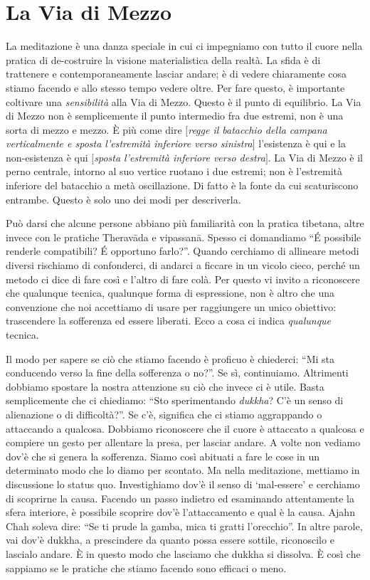 \section*{La Via di Mezzo}

La meditazione è una danza speciale in cui ci impegniamo con tutto il cuore nella pratica di de-costruire la visione materialistica della realtà. La sfida è di trattenere e contemporaneamente lasciar andare; è di vedere chiaramente cosa stiamo facendo e allo stesso tempo vedere oltre. Per fare questo, è importante coltivare una \textit{sensibilità} alla Via di Mezzo. Questo è il punto di equilibrio. La Via di Mezzo non è semplicemente il punto intermedio fra due estremi, non è una sorta di mezzo e mezzo. È più come dire $[$\textit{regge il batacchio della campana verticalmente e sposta l'estremità inferiore verso sinistra}$]$ l'esistenza è qui e la non-esistenza è qui $[$\textit{sposta l'estremità inferiore verso destra}$]$. La Via di Mezzo è il perno centrale, intorno al suo vertice ruotano i due estremi; non è l'estremità inferiore del batacchio a metà oscillazione. Di fatto è la fonte da cui scaturiscono entrambe. Questo è solo uno dei modi per descriverla.

Può darsi che alcune persone abbiano più familiarità con la pratica tibetana, altre invece con le pratiche Theravāda e vipassanā. Spesso ci domandiamo ``É possibile renderle compatibili? É opportuno farlo?''. Quando cerchiamo di allineare metodi diversi rischiamo di confonderci, di andarci a ficcare in un vicolo cieco, perché un metodo ci dice di fare così e l'altro di fare colà. Per questo vi invito a riconoscere che qualunque tecnica, qualunque forma di espressione, non è altro che una convenzione che noi accettiamo di usare per raggiungere un unico obiettivo: trascendere la sofferenza ed essere liberati. Ecco a cosa ci indica \textit{qualunque} tecnica. 

Il modo per sapere se ciò che stiamo facendo è proficuo è chiederci: ``Mi sta conducendo verso la fine della sofferenza o no?''. Se sì, continuiamo. Altrimenti dobbiamo spostare la nostra attenzione su ciò che invece ci è utile. Basta semplicemente che ci chiediamo: ``Sto sperimentando \textit{dukkha}? C'è un senso di alienazione o di difficoltà?''. Se c'è, significa che ci stiamo aggrappando o attaccando a qualcosa. Dobbiamo riconoscere che il cuore è attaccato a qualcosa e compiere un gesto per allentare la presa, per lasciar andare. A volte non vediamo dov'è che si genera la sofferenza. Siamo così abituati a fare le cose in un determinato modo che lo diamo per scontato. Ma nella meditazione, mettiamo in discussione lo status quo. Investighiamo dov'è il senso di `mal-essere' e cerchiamo di scoprirne la causa. Facendo un passo indietro ed esaminando attentamente la sfera interiore, è possibile scoprire dov'è l'attaccamento e qual è la causa. Ajahn Chah soleva dire: ``Se ti prude la gamba, mica ti gratti l'orecchio''. In altre parole, vai dov'è dukkha, a prescindere da quanto possa essere sottile, riconoscilo e lascialo andare. È in questo modo che lasciamo che dukkha si dissolva. È così che sappiamo se le pratiche che stiamo facendo sono efficaci o meno.

